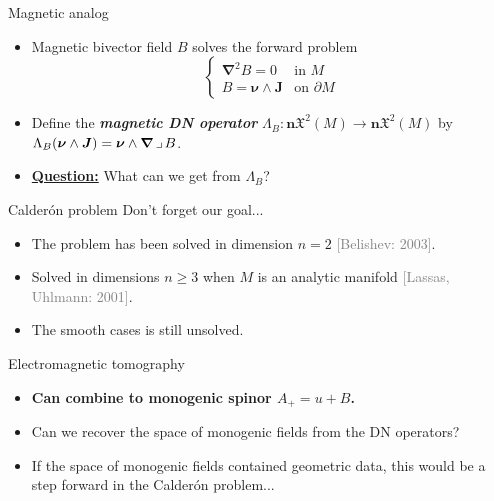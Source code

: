 \documentclass[aspectratio=169]{beamer}
\newcommand\boldgreen[1]{\textcolor{lighter_csu_green}{\emph{\textbf{#1}}}}
\newcommand\boldgold[1]{\textcolor{csu_gold}{\textbf{#1}}}
\newcommand\grey[1]{\textcolor{gray}{#1}}
\newcommand{\normalpart}{\boldsymbol{n}}
\newcommand{\grad}{\boldsymbol{\nabla}}
\newcommand{\blade}[1]{\boldsymbol{#1}}
\newcommand{\normal}{\blade{\nu}}
\newcommand{\contract}{\hspace*{.5mm} \lrcorner \hspace*{.5mm}}
\newcommand{\smoothfields}{\mathfrak{X}}
\begin{document}
\begin{frame}{Magnetic analog}
\vfill
\begin{itemize}
\pause
\item Magnetic bivector field $B$ solves the forward problem
\[
\begin{cases}
\grad^2 B = 0 & \textrm{in $M$}\\
B = \normal \wedge \blade{J} & \textrm{on $\partial M$}
\end{cases}
\]
\pause
\item Define the \boldgreen{magnetic DN operator} $\Lambda_B \colon \normalpart \smoothfields^2(M) \to \normalpart \smoothfields^2(M)$ by $\Lambda_B(\normal \wedge \blade{J}) = \normal \wedge \grad \contract B$.
\pause
\item \textbf{\underline{Question:}} What can we get from $\Lambda_B$?
\end{itemize}
\vfill
\end{frame}
\begin{frame}{Calder\'on problem}
\vfill
Don't forget our goal...
\begin{itemize}
\pause
    \item The problem has been solved in dimension $n=2$ \grey{[Belishev: 2003]}.
\pause
    \item Solved in dimensions $n\geq 3$ when $M$ is an analytic manifold \grey{[Lassas, Uhlmann: 2001]}.
\pause
\item The smooth cases is still unsolved.
\end{itemize}
\vfill
\end{frame}

\begin{frame}{Electromagnetic tomography}
\vfill
\begin{itemize}
\pause
\item \boldgold{Can combine to monogenic spinor $A_+=u+B$.}
\pause
\item Can we recover the space of monogenic fields from the DN operators?
\pause
\item If the space of monogenic fields contained geometric data, this would be a step forward in the Calder\'on problem...
\end{itemize}
\vfill
\end{frame}
\end{document}
